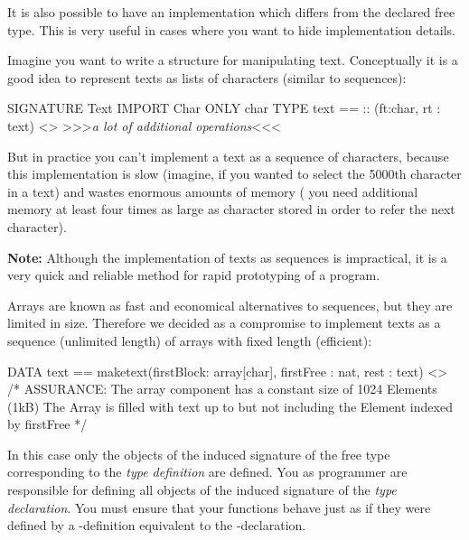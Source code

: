 \experienced It is also possible to have an implementation which
differs from the declared free type.
This is very useful in cases where you want to hide implementation
details.

Imagine you want to write a structure for manipulating text.
Conceptually it is a good idea to represent texts as lists of
characters (similar to sequences):
\begin{prog}
  SIGNATURE Text
  IMPORT Char ONLY char
  TYPE text == :: (ft:char, rt : text)
               <>
 >>>{\em a lot of additional operations\/}<<<
\end{prog}

But in practice you can't implement a text as a sequence of
characters, because this implementation is slow (imagine, if you wanted to
select the 5000th character in a text) and wastes enormous amounts of
memory ( you need additional memory at
least four times as large as  character stored in order to refer the next
character). 

{\bf Note:\/} Although the implementation of texts as sequences is impractical,
it is a very quick and reliable method for rapid prototyping of a program.
\medskip

Arrays are known as fast and economical alternatives to sequences, but
they are limited in size.
Therefore we decided as a compromise to implement texts as a sequence
(unlimited length) of arrays with fixed length (efficient):
\begin{prog}
  DATA text == maketext(firstBlock: array[char],
                        firstFree : nat,
                        rest      : text)
               <>
  /* ASSURANCE: The array component has a constant size 
                     of 1024 Elements (1kB)
                The Array is filled with text up to but not including
                     the Element indexed by firstFree */
\end{prog}

In this case only the objects of the induced signature of the free
type corresponding to the  {\em type definition\/} are defined.
You as programmer are responsible for defining all objects of the
induced signature of the {\em type declaration\/}.
You must ensure that your functions behave just as if they
were defined by a -definition equivalent to the
-declaration. 

